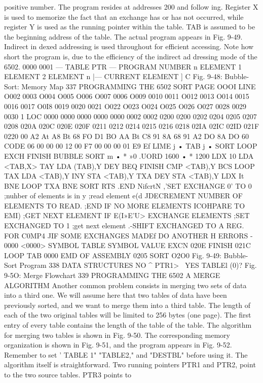 {{{{{{{{{{{{{{{{{{{{{{{{{{{{{{{{{{{{{{{{{{{{{{{{{{{{{{{{{{{{{{{{{{{{{{{{{{{{{{{{{{{{{{{{{{{{{{positive number. The program resides at addresses 200 and follow
ing. Register X is used to memorize the fact that an exchange has
or has not occurred, while register Y is used as the running pointer
within the table. TAB is assumed to be the beginning address of
the table. The actual program appears in Fig. 9-49. Indirect in
dexed addressing is used throughout for efficient accessing. Note
how short the program is, due to the efficiency of the indirect ad
dressing mode of the 6502.
0000
0001
— TABLE PTR —
PROGRAM
NUMBER n
ELEMENT 1
ELEMENT 2
ELEMENT n
|—
CURRENT ELEMENT
] C
Fig. 9-48: Bubble-Sort: Memory Map
337
PROGRAMMING THE 6502
SORT PAGE OOOI
LINE
O002
0003
O004
O005
O006
O007
0006
O009
0010
0011
O012
0013
O014
0015
0016
0017
O0I8
0019
0020
0021
O022
O023
O024
O025
O026
O027
0028
0029
0030
1 LOC
0000
0000
0000
0000
0000
0002
0002
0200
0200
0202
0204
0205
0207
0208
020A
020C
020E
020F
0211
0212
0214
0215
0216
0218
02IA
02IC
02ID
021F
0220
00
A2
At
A8
Bt
68
FO
D1
BO
AA
Bt
C8
91
8A
68
91
A2
DO
8A
DO
60
CODE
06
00
00
00
12
00
F7
00
00
00
01
E9
Ef
LIME
j
•
TAB
j
•
SORT
LOOP
EXCH
FINISH
BUBBLE SORT m
• * »0
.UORD 1600
• * 1200
LDX 10
LDA <TAB,X>
TAY
LDA (TAB),Y
DEY
BEQ FINISH
CMP <TAB),Y
BCS LOOP
TAX
LDA <TAB),Y
INY
STA <TAB),Y
TXA
DEY
STA <TAB),Y
LDX It
BNE LOOP
TXA
BNE SORT
RTS
.END
NifcrtN
,'SET EXCHANGE 0' TO 0
;nuhber of elements is in y
;read element e(d
JDECREMENT NUMBER OF ELEMENTS TO READ.
;END IF NO MORE ELEMENTS
ICOHPARE TO EMI)
;GET NEXT ELEMENT IF E(I»E'U>
{EXCHANGE ELEMENTS
;SET EXCHANGED TO 1
;get next element
.-SHIFT EXCHANGED TO A REG. FOR C0MP4
JIF SOME EXCHANGES MADEf DO ANOTHER H
ERRORS - 0000 <0000>
SYMBOL TABLE
SYMBOL VALUE
EXCN 020E FINISH 021C LOOP
TAB 0000
EMD OF ASSEMBLY
0205 SORT O2O0
Fig. 9-49: Bubble-Sort Program
338
DATA STRUCTURES
NO ^ PTR1> \ YES
TABLEl (0)?
Fig. 9-5O: Merge Flowchart
339
PROGRAMMING THE 6502
A MERGE ALGORITHM
Another common problem consists in merging two sets of data
into a third one. We will assume here that two tables of data have
been previously sorted, and we want to merge them into a third table. The
length of each of the two original tables will be limited to 256 bytes (one
page). The first entry of every table contains the length of the table
of the table.
The algorithm for merging two tables is shown in Fig. 9-50. The
corresponding memory organization is shown in Fig. 9-51, and the
program appears in Fig. 9-52. Remember to set ' TABLE 1"
"TABLE2," and "DESTBL" before using it.
The algorithm itself is straightforward. Two running pointers
PTR1 and PTR2, point to the two source tables. PTR3 points to
}}}}}}}}}}}}}}}}}}}}}}}}}}}}}}}}}}}}}}}}}}}}}}}}}}}}}}}}}}}}}}}}}}}}}}}}}}}}}}}}}}}}}}}}}}}}}}}
